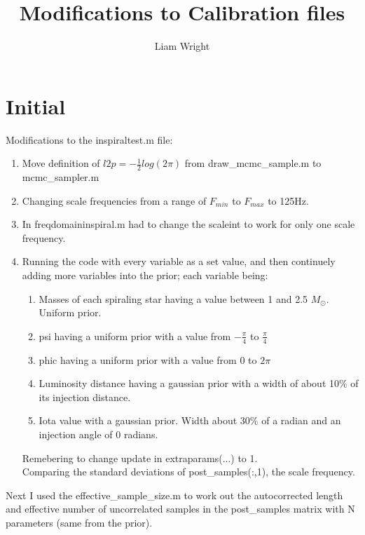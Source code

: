 \documentclass[a4paper]{article}
\title{Modifications to Calibration files}
\author{Liam Wright}
\begin{document}
\maketitle

\section*{Initial}

Modifications to the inspiraltest.m file:
\begin{enumerate}
   \item Move definition of $l2p = -\frac{1}{2}log(2\pi)$ from draw\_mcmc\_sample.m to mcmc\_sampler.m
   \item Changing scale frequencies from a range of $F_{min}$ to $F_{max}$ to 125Hz.
   \item In freqdomaininspiral.m had to change the scaleint to work for only one scale frequency.
   \item Running the code with every variable as a set value, and then continuely adding more variables into the prior; each variable being:
   \begin{enumerate}
      \item Masses of each spiraling star having a value between 1 and 2.5 $M_{\odot}$. Uniform prior.
      \item psi having a uniform prior with a value from $-\frac{\pi}{4}$ to $\frac{\pi}{4}$
      \item phic having a uniform prior with a value from 0 to $2\pi$
      \item Luminosity distance having a gaussian prior with a width of about 10\% of its injection distance.
      \item Iota value with a gaussian prior. Width about 30\% of a radian and an injection angle of 0 radians.

   \end{enumerate}
   Remebering to change update in extraparams(...) to 1. \\

   Comparing the standard deviations of post\_samples(:,1), the scale frequency.

\end{enumerate}


Next I used the effective\_sample\_size.m to work out the autocorrected length and effective number of uncorrelated samples in the post\_samples matrix with N parameters (same  from the prior). \\
\end{document}
